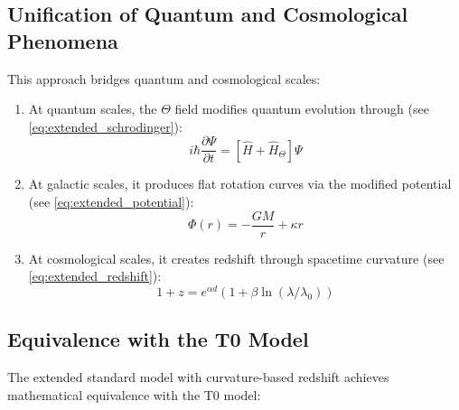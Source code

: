 \documentclass[12pt,a4paper]{article}
\begin{document}
	\subsection{Unification of Quantum and Cosmological Phenomena}
	\label{subsec:quantum_cosmo}
	
	This approach bridges quantum and cosmological scales\cite{pascher_part1_2025, pascher_part2_2025}:
	
	\begin{enumerate}
		\item At quantum scales, the $\Theta$ field modifies quantum evolution through (see \cref{eq:extended_schrodinger}):
		\begin{equation}
			i\hbar\frac{\partial\Psi}{\partial t} = [\hat{H} + \hat{H}_{\Theta}]\Psi
		\end{equation}
		
		\item At galactic scales, it produces flat rotation curves via the modified potential (see \cref{eq:extended_potential}):
		\begin{equation}
			\Phi(r) = -\frac{GM}{r} + \kappa r
		\end{equation}
		
		\item At cosmological scales, it creates redshift through spacetime curvature (see \cref{eq:extended_redshift}):
		\begin{equation}
			1 + z = e^{\alpha d}(1 + \beta \ln(\lambda/\lambda_0))
		\end{equation}
	\end{enumerate}
	
	\subsection{Equivalence with the T0 Model}
	\label{subsec:model_equivalence}
	
	The extended standard model with curvature-based redshift achieves mathematical equivalence with the T0 model\cite{pascher_messdifferenzen_2025, pascher_feldtheorie_2025}:
	
\end{document}
